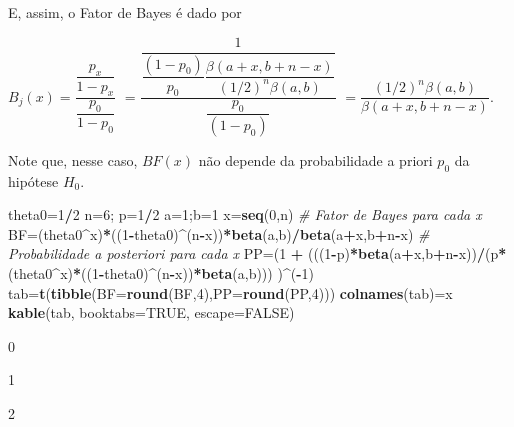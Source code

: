 \documentclass[
]{book}
\newenvironment{Shaded}{\begin{snugshade}}{\end{snugshade}}
\newcommand{\CommentTok}[1]{\textcolor[rgb]{0.56,0.35,0.01}{\textit{#1}}}
\newcommand{\DataTypeTok}[1]{\textcolor[rgb]{0.13,0.29,0.53}{#1}}
\newcommand{\DecValTok}[1]{\textcolor[rgb]{0.00,0.00,0.81}{#1}}
\newcommand{\KeywordTok}[1]{\textcolor[rgb]{0.13,0.29,0.53}{\textbf{#1}}}
\newcommand{\NormalTok}[1]{#1}
\newcommand{\OperatorTok}[1]{\textcolor[rgb]{0.81,0.36,0.00}{\textbf{#1}}}
\newcommand{\OtherTok}[1]{\textcolor[rgb]{0.56,0.35,0.01}{#1}}
\newcommand{\StringTok}[1]{\textcolor[rgb]{0.31,0.60,0.02}{#1}}
\begin{document}
E, assim, o Fator de Bayes é dado por

\(B_j(x)=\dfrac{\dfrac{p_x}{1-p_x}}{\dfrac{p_0}{1-p_0}}\) \(=\dfrac{\dfrac{1}{\dfrac{(1-p_0)}{p_0}\dfrac{\beta(a+x,b+n-x)}{(1/2)^n\beta(a,b)}}}{\dfrac{p_0}{(1-p_0)}}\)
\(=\dfrac{(1/2)^n\beta(a,b)}{\beta(a+x,b+n-x)}\).

Note que, nesse caso, \(BF(x)\) não depende da probabilidade a priori \(p_0\) da hipótese \(H_0\).

\begin{Shaded}
\begin{Highlighting}[]
\NormalTok{theta0=}\DecValTok{1}\OperatorTok{/}\DecValTok{2}
\NormalTok{n=}\DecValTok{6}\NormalTok{; p=}\DecValTok{1}\OperatorTok{/}\DecValTok{2}
\NormalTok{a=}\DecValTok{1}\NormalTok{;b=}\DecValTok{1}
\NormalTok{x=}\KeywordTok{seq}\NormalTok{(}\DecValTok{0}\NormalTok{,n)}
\CommentTok{# Fator de Bayes para cada x}
\NormalTok{BF=(theta0}\OperatorTok{^}\NormalTok{x)}\OperatorTok{*}\NormalTok{((}\DecValTok{1}\OperatorTok{-}\NormalTok{theta0)}\OperatorTok{^}\NormalTok{(n}\OperatorTok{-}\NormalTok{x))}\OperatorTok{*}\KeywordTok{beta}\NormalTok{(a,b)}\OperatorTok{/}\KeywordTok{beta}\NormalTok{(a}\OperatorTok{+}\NormalTok{x,b}\OperatorTok{+}\NormalTok{n}\OperatorTok{-}\NormalTok{x)}
\CommentTok{# Probabilidade a posteriori para cada x}
\NormalTok{PP=(}\DecValTok{1} \OperatorTok{+}\StringTok{ }\NormalTok{(((}\DecValTok{1}\OperatorTok{-}\NormalTok{p)}\OperatorTok{*}\KeywordTok{beta}\NormalTok{(a}\OperatorTok{+}\NormalTok{x,b}\OperatorTok{+}\NormalTok{n}\OperatorTok{-}\NormalTok{x))}\OperatorTok{/}\NormalTok{(p}\OperatorTok{*}\NormalTok{(theta0}\OperatorTok{^}\NormalTok{x)}\OperatorTok{*}\NormalTok{((}\DecValTok{1}\OperatorTok{-}\NormalTok{theta0)}\OperatorTok{^}\NormalTok{(n}\OperatorTok{-}\NormalTok{x))}\OperatorTok{*}\KeywordTok{beta}\NormalTok{(a,b)))  )}\OperatorTok{^}\NormalTok{(}\OperatorTok{-}\DecValTok{1}\NormalTok{)}
\NormalTok{tab=}\KeywordTok{t}\NormalTok{(}\KeywordTok{tibble}\NormalTok{(}\DataTypeTok{BF=}\KeywordTok{round}\NormalTok{(BF,}\DecValTok{4}\NormalTok{),}\DataTypeTok{PP=}\KeywordTok{round}\NormalTok{(PP,}\DecValTok{4}\NormalTok{)))}
\KeywordTok{colnames}\NormalTok{(tab)=x}
\KeywordTok{kable}\NormalTok{(tab, }\DataTypeTok{booktabs=}\OtherTok{TRUE}\NormalTok{, }\DataTypeTok{escape=}\OtherTok{FALSE}\NormalTok{)}
\end{Highlighting}
\end{Shaded}

0

1

2
\end{document}
